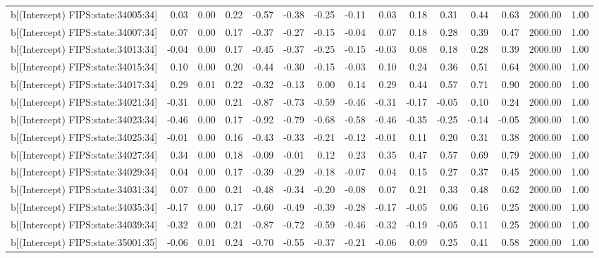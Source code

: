 \begin{table}[ht]
\begin{tabular}{rrrrrrrrrrrrrrr}
  b[(Intercept) FIPS:state:34005:34] & 0.03 & 0.00 & 0.22 & -0.57 & -0.38 & -0.25 & -0.11 & 0.03 & 0.18 & 0.31 & 0.44 & 0.63 & 2000.00 & 1.00 \\ 
  b[(Intercept) FIPS:state:34007:34] & 0.07 & 0.00 & 0.17 & -0.37 & -0.27 & -0.15 & -0.04 & 0.07 & 0.18 & 0.28 & 0.39 & 0.47 & 2000.00 & 1.00 \\ 
  b[(Intercept) FIPS:state:34013:34] & -0.04 & 0.00 & 0.17 & -0.45 & -0.37 & -0.25 & -0.15 & -0.03 & 0.08 & 0.18 & 0.28 & 0.39 & 2000.00 & 1.00 \\ 
  b[(Intercept) FIPS:state:34015:34] & 0.10 & 0.00 & 0.20 & -0.44 & -0.30 & -0.15 & -0.03 & 0.10 & 0.24 & 0.36 & 0.51 & 0.64 & 2000.00 & 1.00 \\ 
  b[(Intercept) FIPS:state:34017:34] & 0.29 & 0.01 & 0.22 & -0.32 & -0.13 & 0.00 & 0.14 & 0.29 & 0.44 & 0.57 & 0.71 & 0.90 & 2000.00 & 1.00 \\ 
  b[(Intercept) FIPS:state:34021:34] & -0.31 & 0.00 & 0.21 & -0.87 & -0.73 & -0.59 & -0.46 & -0.31 & -0.17 & -0.05 & 0.10 & 0.24 & 2000.00 & 1.00 \\ 
  b[(Intercept) FIPS:state:34023:34] & -0.46 & 0.00 & 0.17 & -0.92 & -0.79 & -0.68 & -0.58 & -0.46 & -0.35 & -0.25 & -0.14 & -0.05 & 2000.00 & 1.00 \\ 
  b[(Intercept) FIPS:state:34025:34] & -0.01 & 0.00 & 0.16 & -0.43 & -0.33 & -0.21 & -0.12 & -0.01 & 0.11 & 0.20 & 0.31 & 0.38 & 2000.00 & 1.00 \\ 
  b[(Intercept) FIPS:state:34027:34] & 0.34 & 0.00 & 0.18 & -0.09 & -0.01 & 0.12 & 0.23 & 0.35 & 0.47 & 0.57 & 0.69 & 0.79 & 2000.00 & 1.00 \\ 
  b[(Intercept) FIPS:state:34029:34] & 0.04 & 0.00 & 0.17 & -0.39 & -0.29 & -0.18 & -0.07 & 0.04 & 0.15 & 0.27 & 0.37 & 0.45 & 2000.00 & 1.00 \\ 
  b[(Intercept) FIPS:state:34031:34] & 0.07 & 0.00 & 0.21 & -0.48 & -0.34 & -0.20 & -0.08 & 0.07 & 0.21 & 0.33 & 0.48 & 0.62 & 2000.00 & 1.00 \\ 
  b[(Intercept) FIPS:state:34035:34] & -0.17 & 0.00 & 0.17 & -0.60 & -0.49 & -0.39 & -0.28 & -0.17 & -0.05 & 0.06 & 0.16 & 0.25 & 2000.00 & 1.00 \\ 
  b[(Intercept) FIPS:state:34039:34] & -0.32 & 0.00 & 0.21 & -0.87 & -0.72 & -0.59 & -0.46 & -0.32 & -0.19 & -0.05 & 0.11 & 0.25 & 2000.00 & 1.00 \\ 
  b[(Intercept) FIPS:state:35001:35] & -0.06 & 0.01 & 0.24 & -0.70 & -0.55 & -0.37 & -0.21 & -0.06 & 0.09 & 0.25 & 0.41 & 0.58 & 2000.00 & 1.00 \\ 

\end{tabular}
\end{table}
